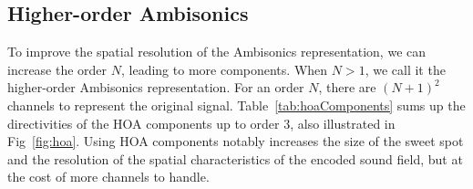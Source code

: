 \subsection{Higher-order Ambisonics}

To improve the spatial resolution of the Ambisonics representation, we can increase the order $N$, leading to more components. When $N>1$, we call it the higher-order Ambisonics representation. For an order $N$, there are $(N+1)^2$ channels to represent the original signal. Table~\ref{tab:hoaComponents} sums up the directivities of the HOA components up to order 3, also illustrated in Fig~\ref{fig:hoa}. Using HOA components notably increases the size of the sweet spot and the resolution of the spatial characteristics of the encoded sound field, but at the cost of more channels to handle.

